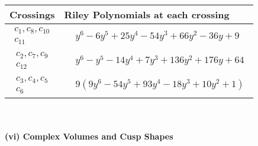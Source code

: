 \documentclass[1p]{elsarticle_modified}
\theoremstyle{definition}
\begin{document}
\begin{tabular}{m{50pt}|m{274pt}}
Crossings & \hspace{64pt}Riley Polynomials at each crossing \\
\hline $$\begin{aligned}c_{1},c_{8},c_{10}\\c_{11}\end{aligned}$$&$\begin{aligned}
&y^6-6 y^5+25 y^4-54 y^3+66 y^2-36 y+9
\end{aligned}$\\
\hline $$\begin{aligned}c_{2},c_{7},c_{9}\\c_{12}\end{aligned}$$&$\begin{aligned}
&y^6- y^5-14 y^4+7 y^3+136 y^2+176 y+64
\end{aligned}$\\
\hline $$\begin{aligned}c_{3},c_{4},c_{5}\\c_{6}\end{aligned}$$&$\begin{aligned}
&9(9 y^6-54 y^5+93 y^4-18 y^3+10 y^2+1)
\end{aligned}$\\
\hline
\end{tabular}\\~\\
\newpage\flushleft \textbf{(vi) Complex Volumes and Cusp Shapes}
\end{document}
